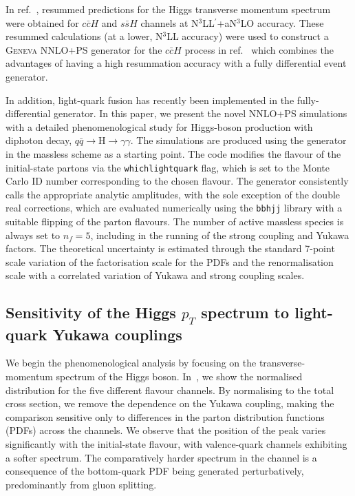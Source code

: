 \documentclass[11pt,a4paper]{article}
\begin{document}
In ref.~\cite{Cal:2023mib}, resummed predictions for the Higgs transverse momentum spectrum were obtained for $c\bar{c}H$ and $s\bar{s}H$ channels at N$^3$LL$^{\prime}$+aN$^3$LO accuracy. These resummed calculations (at a lower, N$^3$LL accuracy) were used to construct a \textsc{Geneva} NNLO+PS generator for the $c\bar{c}H$ process in ref.~\cite{Gavardi:2025zpf} which combines the advantages of having a high resummation accuracy with a fully differential event generator.

In addition, light-quark fusion has recently been implemented in the fully-differential \minnlo{} generator. In this paper, we present the novel NNLO+PS simulations with a detailed phenomenological study for Higgs-boson production with diphoton decay, $q\bar q\rightarrow \text{H}\rightarrow \gamma\gamma$. The simulations are produced using the \minnlo{} \bbH{} generator in the massless scheme as a starting point. The code modifies the flavour of the initial-state partons via the \texttt{whichlightquark} flag, which is set to the Monte Carlo ID number corresponding to the chosen flavour. The generator consistently calls the appropriate analytic amplitudes, with the sole exception of the double real corrections, which are evaluated numerically using the \OpenLoops{} \texttt{bbhjj} library with a suitable flipping of the parton flavours. The number of active massless species is always set to \( n_f = 5 \), including in the running of the strong coupling and Yukawa factors. The theoretical uncertainty is estimated through the standard 7-point scale variation of the factorisation scale for the PDFs and the renormalisation scale with a correlated variation of Yukawa and strong coupling scales.

\subsection{Sensitivity of the Higgs $p_T$ spectrum to light-quark Yukawa couplings}
We begin the phenomenological analysis by focusing on the transverse-momentum spectrum of the Higgs boson. In~, we show the normalised distribution for the five different flavour channels. By normalising to the total cross section, we remove the dependence on the Yukawa coupling, making the comparison sensitive only to differences in the parton distribution functions (PDFs) across the channels. We observe that the position of the peak varies significantly with the initial-state flavour, with valence-quark channels exhibiting a softer spectrum. The comparatively harder spectrum in the \bbH{} channel is a consequence of the bottom-quark PDF being generated perturbatively, predominantly from gluon splitting.
\end{document}
